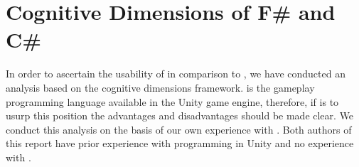 \section{Cognitive Dimensions of F\# and C\#}
In order to ascertain the usability of \fs in comparison to \cs, we have conducted an analysis based on the cognitive dimensions framework\cite{green1996usability}. \cs is the gameplay programming language available in the Unity game engine, therefore, if \fs is to usurp this position the advantages and disadvantages should be made clear. We conduct this analysis on the basis of our own experience with \fs. Both authors of this report have prior experience with \cs programming in Unity and no experience with \fs.















